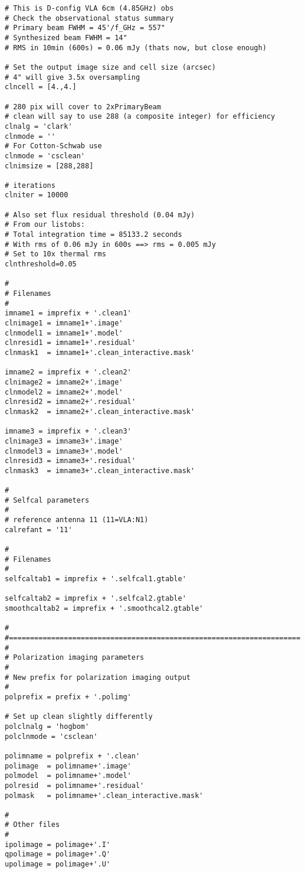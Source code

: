 \begin{verbatim}
# This is D-config VLA 6cm (4.85GHz) obs
# Check the observational status summary
# Primary beam FWHM = 45'/f_GHz = 557"
# Synthesized beam FWHM = 14"
# RMS in 10min (600s) = 0.06 mJy (thats now, but close enough)

# Set the output image size and cell size (arcsec)
# 4" will give 3.5x oversampling
clncell = [4.,4.]

# 280 pix will cover to 2xPrimaryBeam
# clean will say to use 288 (a composite integer) for efficiency
clnalg = 'clark'
clnmode = ''
# For Cotton-Schwab use
clnmode = 'csclean'
clnimsize = [288,288]

# iterations
clniter = 10000

# Also set flux residual threshold (0.04 mJy)
# From our listobs:
# Total integration time = 85133.2 seconds
# With rms of 0.06 mJy in 600s ==> rms = 0.005 mJy
# Set to 10x thermal rms
clnthreshold=0.05

#
# Filenames
#
imname1 = imprefix + '.clean1'
clnimage1 = imname1+'.image'
clnmodel1 = imname1+'.model'
clnresid1 = imname1+'.residual'
clnmask1  = imname1+'.clean_interactive.mask'

imname2 = imprefix + '.clean2'
clnimage2 = imname2+'.image'
clnmodel2 = imname2+'.model'
clnresid2 = imname2+'.residual'
clnmask2  = imname2+'.clean_interactive.mask'

imname3 = imprefix + '.clean3'
clnimage3 = imname3+'.image'
clnmodel3 = imname3+'.model'
clnresid3 = imname3+'.residual'
clnmask3  = imname3+'.clean_interactive.mask'

#
# Selfcal parameters
#
# reference antenna 11 (11=VLA:N1)
calrefant = '11'

#
# Filenames
#
selfcaltab1 = imprefix + '.selfcal1.gtable'

selfcaltab2 = imprefix + '.selfcal2.gtable'
smoothcaltab2 = imprefix + '.smoothcal2.gtable'

#
#=====================================================================
#
# Polarization imaging parameters
#
# New prefix for polarization imaging output
#
polprefix = prefix + '.polimg'

# Set up clean slightly differently
polclnalg = 'hogbom'
polclnmode = 'csclean'

polimname = polprefix + '.clean'
polimage  = polimname+'.image'
polmodel  = polimname+'.model'
polresid  = polimname+'.residual'
polmask   = polimname+'.clean_interactive.mask'

#
# Other files
#
ipolimage = polimage+'.I'
qpolimage = polimage+'.Q'
upolimage = polimage+'.U'


\end{verbatim}
